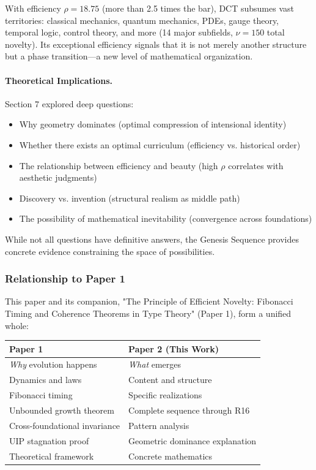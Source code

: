 \documentclass[11pt]{article}
\theoremstyle{definition}
\begin{document}
With efficiency $\rho=18.75$ (more than 2.5 times the bar), DCT subsumes vast territories: classical mechanics, quantum mechanics, PDEs, gauge theory, temporal logic, control theory, and more (14 major subfields, $\nu=150$ total novelty). Its exceptional efficiency signals that it is not merely another structure but a phase transition—a new level of mathematical organization.

\paragraph{Theoretical Implications.}
Section 7 explored deep questions:
\begin{itemize}
\item Why geometry dominates (optimal compression of intensional identity)
\item Whether there exists an optimal curriculum (efficiency vs. historical order)
\item The relationship between efficiency and beauty (high $\rho$ correlates with aesthetic judgments)
\item Discovery vs. invention (structural realism as middle path)
\item The possibility of mathematical inevitability (convergence across foundations)
\end{itemize}

While not all questions have definitive answers, the Genesis Sequence provides concrete evidence constraining the space of possibilities.

\subsubsection{Relationship to Paper 1}

This paper and its companion, "The Principle of Efficient Novelty: Fibonacci Timing and Coherence Theorems in Type Theory" (Paper 1), form a unified whole:

\begin{center}
\begin{tabular}{ll}
\toprule
\textbf{Paper 1} & \textbf{Paper 2 (This Work)} \\
\midrule
\emph{Why} evolution happens & \emph{What} emerges \\
Dynamics and laws & Content and structure \\
Fibonacci timing & Specific realizations \\
Unbounded growth theorem & Complete sequence through R16 \\
Cross-foundational invariance & Pattern analysis \\
UIP stagnation proof & Geometric dominance explanation \\
Theoretical framework & Concrete mathematics \\
\bottomrule
\end{tabular}
\end{center}
\end{document}
